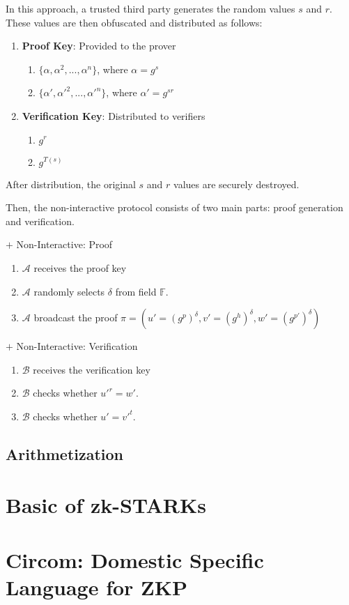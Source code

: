 \documentclass{article}
\begin{document}
In this approach, a trusted third party generates the random values $s$ and $r$. These values are then obfuscated and distributed as follows:

\begin{enumerate}
    \item \textbf{Proof Key}: Provided to the prover \begin{enumerate}
        \item $\{\alpha, \alpha^2, ..., \alpha^{n}\}$, where $\alpha = g^{s}$
        \item $\{\alpha', \alpha'^2, ..., \alpha'^{n}\}$, where $\alpha' = g^{sr}$
        \end{enumerate}
    \item \textbf{Verification Key}: Distributed to verifiers \begin{enumerate}
        \item $g^{r}$
        \item $g^{T(s)}$
    \end{enumerate}
\end{enumerate}

After distribution, the original $s$ and $r$ values are securely destroyed.

Then, the non-interactive protocol consists of two main parts: proof generation and verification.

\begin{protocol}{$+$ Non-Interactive: Proof}{}
    \begin{enumerate}
        \item $\mathcal{A}$ receives the proof key
        \item $\mathcal{A}$ randomly selects $\delta$ from field $\mathbb{F}$.
        \item $\mathcal{A}$ broadcast the proof $\pi = (u' = (g^{p})^{\delta}, v' = (g^{h})^{\delta}, w' = (g^{p'})^{\delta})$
    \end{enumerate}
\end{protocol}

\begin{protocol}{$+$ Non-Interactive: Verification}{}
    \begin{enumerate}
        \item $\mathcal{B}$ receives the verification key
        \item $\mathcal{B}$ checks whether $u'^{r} = w'$.
        \item $\mathcal{B}$ checks whether $u' = v'^{t}$.
    \end{enumerate}
\end{protocol}

\subsection{Arithmetization}

\section{Basic of zk-STARKs}

\section{Circom: Domestic Specific Language for ZKP}

  
  


\appendix
\end{document}
